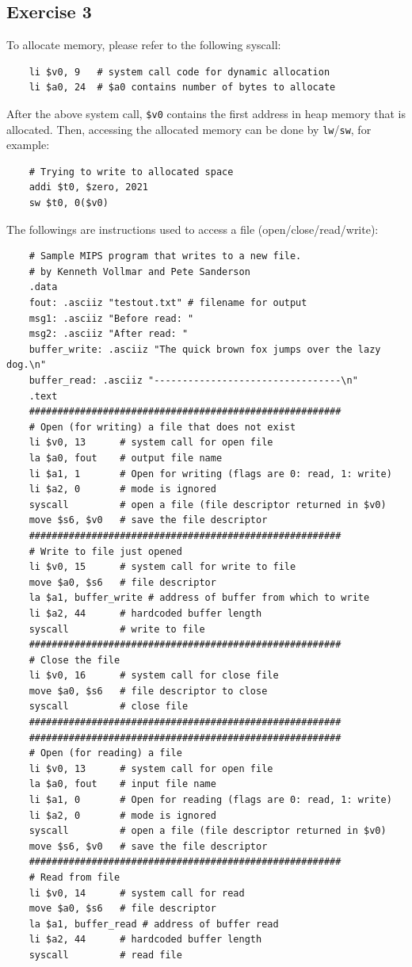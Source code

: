 \subsection{Exercise 3}
To allocate memory, please refer to the following syscall:
\begin{lstlisting}
    li $v0, 9   # system call code for dynamic allocation
    li $a0, 24  # $a0 contains number of bytes to allocate
\end{lstlisting}
After the above system call, \texttt{\$v0} contains the first address in heap memory
that is allocated. Then, accessing the allocated memory can be done by
\texttt{lw}/\texttt{sw}, for example:
\begin{lstlisting}
    # Trying to write to allocated space
    addi $t0, $zero, 2021
    sw $t0, 0($v0)
\end{lstlisting}
The followings are instructions used to access a file (open/close/read/write):
\begin{lstlisting}
    # Sample MIPS program that writes to a new file.
    # by Kenneth Vollmar and Pete Sanderson
    .data
    fout: .asciiz "testout.txt" # filename for output
    msg1: .asciiz "Before read: "
    msg2: .asciiz "After read: "
    buffer_write: .asciiz "The quick brown fox jumps over the lazy dog.\n"
    buffer_read: .asciiz "---------------------------------\n"
    .text
    #######################################################
    # Open (for writing) a file that does not exist
    li $v0, 13      # system call for open file
    la $a0, fout    # output file name
    li $a1, 1       # Open for writing (flags are 0: read, 1: write)
    li $a2, 0       # mode is ignored
    syscall         # open a file (file descriptor returned in $v0)
    move $s6, $v0   # save the file descriptor
    #######################################################
    # Write to file just opened
    li $v0, 15      # system call for write to file
    move $a0, $s6   # file descriptor
    la $a1, buffer_write # address of buffer from which to write
    li $a2, 44      # hardcoded buffer length
    syscall         # write to file
    #######################################################
    # Close the file
    li $v0, 16      # system call for close file
    move $a0, $s6   # file descriptor to close
    syscall         # close file
    #######################################################
    #######################################################
    # Open (for reading) a file
    li $v0, 13      # system call for open file
    la $a0, fout    # input file name
    li $a1, 0       # Open for reading (flags are 0: read, 1: write)
    li $a2, 0       # mode is ignored
    syscall         # open a file (file descriptor returned in $v0)
    move $s6, $v0   # save the file descriptor
    #######################################################
    # Read from file
    li $v0, 14      # system call for read
    move $a0, $s6   # file descriptor
    la $a1, buffer_read # address of buffer read
    li $a2, 44      # hardcoded buffer length
    syscall         # read file
\end{lstlisting}
